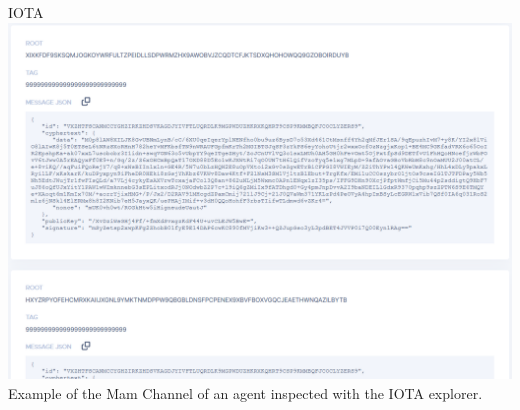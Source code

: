 \begin{frame}{IOTA}
    \centering
    \includegraphics[width=0.85\linewidth]{images/channel.png}\\
    \footnotesize{Example of the Mam Channel of an agent inspected with the IOTA explorer.}
\end{frame}